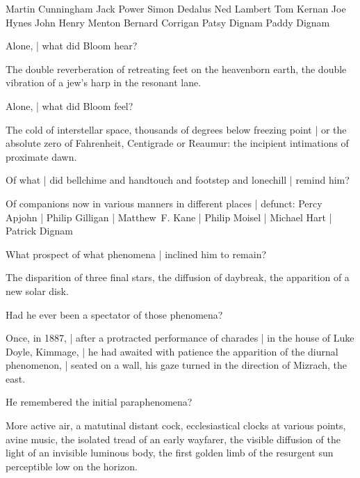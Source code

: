 \Turns[~(men)]
Martin Cunningham
Jack Power
Simon Dedalus
Ned Lambert
Tom Kernan
Joe Hynes
John Henry Menton
Bernard Corrigan
Patsy Dignam
Paddy Dignam



Alone, |
what did Bloom hear?

\Poetry
The double reverberation of retreating feet on the heavenborn earth,
the double vibration of a jew's harp in the resonant lane.


Alone, |
what did Bloom feel?

\Science
The cold of interstellar space,
thousands of degrees below freezing point |
or the absolute zero of Fahrenheit, Centigrade or Reaumur:
the incipient intimations of proximate dawn.


Of what |
did bellchime and handtouch and footstep and lonechill |
remind him?

\Religious
Of companions now in various manners in different places |
defunct:
Percy Apjohn
 |
Philip Gilligan
 |
Matthew~F. Kane
 |
Philip Moisel
 |
Michael Hart
 |
Patrick Dignam


What prospect of what phenomena |
inclined him to remain?

\Science
The disparition of three final stars,
the diffusion of daybreak,
the apparition of a new solar disk.


Had he ever been a spectator of those phenomena?

\Memories
Once, in 1887, |
after a protracted performance of charades |
in the house of Luke Doyle, Kimmage, |
he had awaited with patience the apparition of the diurnal phenomenon, |
seated on a wall,
his gaze turned in the direction of Mizrach, the east.


He remembered the initial paraphenomena?

\Poetry
More active air,
a matutinal distant cock,
ecclesiastical clocks at various points,
avine music,
the isolated tread of an early wayfarer,
the visible diffusion of the light of an invisible luminous body,
the first golden limb of the resurgent sun perceptible low on the horizon.


